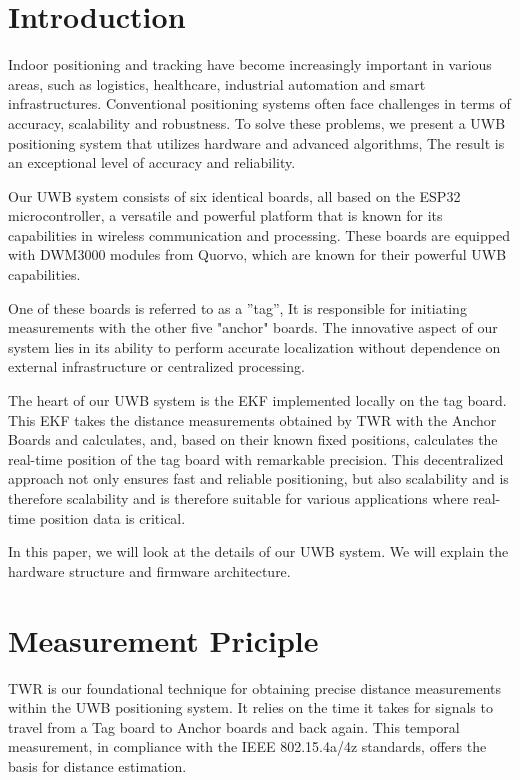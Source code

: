 \documentclass[10pt,a4paper,twocolumn]{article}
\begin{document}

\section{Introduction}\label{section:intro}
Indoor positioning and tracking have become increasingly important in various areas,
such as logistics, healthcare, industrial automation and smart infrastructures.
Conventional positioning systems often face challenges in terms of accuracy, scalability and robustness.
To solve these problems, we present a \ac{UWB} positioning system that utilizes
hardware and advanced algorithms,
The result is an exceptional level of accuracy and reliability.

Our \ac{UWB} system consists of six identical boards,
all based on the ESP32 microcontroller, a versatile and powerful platform that is 
known for its capabilities in wireless communication and processing.
These boards are equipped with DWM3000 modules from Quorvo,
which are known for their powerful UWB capabilities.

One of these boards is referred to as a ''tag'',
It is responsible for initiating measurements with the other five "anchor" boards.
The innovative aspect of our system lies in its ability to perform accurate localization
without dependence on external infrastructure or centralized processing.

The heart of our \ac{UWB} system is the \ac{EKF} implemented locally on the tag board.
This \ac{EKF} takes the distance measurements obtained by \ac{TWR} with the Anchor Boards and calculates,
and, based on their known fixed positions, calculates the real-time position of the tag board
with remarkable precision.
This decentralized approach not only ensures fast and reliable positioning, but also scalability and is therefore
scalability and is therefore suitable for various applications where real-time position data is critical.

In this paper, we will look at the details of our \ac{UWB} system.
We will explain the hardware structure and firmware architecture.

\section{Measurement Priciple}\label{Section:principle}
\acf{TWR} is our foundational technique for obtaining precise distance
measurements within the UWB positioning system.
It relies on the time it takes for signals to travel from a Tag board to Anchor boards
and back again.
This temporal measurement, in compliance with the IEEE 802.15.4a/4z standards,
offers the basis for distance estimation.
\end{document}
